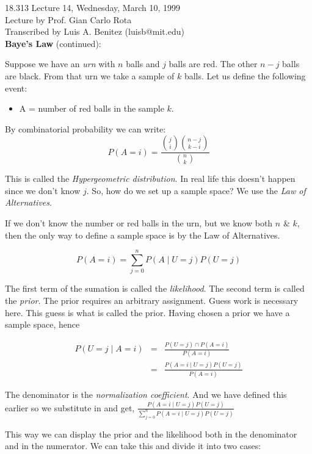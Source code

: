 {\Large 18.313 Lecture 14, Wednesday, March 10, 1999}\\
{\large Lecture by Prof. Gian Carlo Rota}\\
Transcribed by Luis A. Benitez (luisb@mit.edu)\\

{\bf Baye's Law} (continued):

Suppose we have an {\em urn} with $n$ balls and $j$ balls are red.  The other $n-j$ balls are black. From that urn we take a sample of $k$ balls. Let us define the following event:
\begin{itemize}
\item A = number of red balls in the sample $k$.
\end{itemize}

By combinatorial probability we can write:
\begin{displaymath}
P(A=i)=\frac{{{j}\choose{i}}{{n-j}\choose{k-i}}}{{{n}\choose{k}}}
\end{displaymath}

This is called the {\em Hypergeometric distribution}.  In real life this doesn't happen since we don't know $j$.  So, how do we set up a sample space?  We use the {\em Law of Alternatives}.

If we don't know the number or red balls in the urn, but we know both $n$ \& $k$, then the only way to define a sample space is by the Law of Alternatives.

\begin{displaymath}
P(A=i) = \sum_{j=0}^{n} P(A \mid U = j) P(U = j)
\end{displaymath}

The first term of the sumation is called the {\em likelihood}.  The second term is called the {\em prior}.  The prior requires an arbitrary assignment. Guess work is necessary here.  This guess is what is called the prior.  Having chosen a prior we have a sample space, hence

\begin{eqnarray*}
P(U=j \mid A=i) &=& \frac {P(U=j) \cap P(A=i)}  {P(A=i)}\\
		&=& \frac {P(A=i \mid U=j) P(U = j)} {P(A=i)}
\end{eqnarray*}

The denominator is the {\em normalization coefficient}.  And we have defined
this earlier so we substitute in and get,
$\frac {P(A=i \mid U=j) P(U=j)} {\sum_{j=0}^{n} P(A=i \mid U=j)P(U=j)}$

This way we can display the prior and the likelihood both in the denominator and in the numerator.  We can take this and divide it into two cases:

